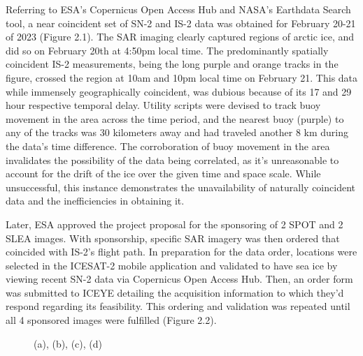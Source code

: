 Referring to ESA's Copernicus Open Access Hub and NASA's Earthdata Search tool, a near coincident set of SN-2 and IS-2 data was obtained for February 20-21 of 2023 (Figure 2.1). The SAR imaging clearly captured regions of arctic ice, and did so on February 20th at 4:50pm local time. The predominantly spatially coincident IS-2 measurements, being the long purple and orange tracks in the figure, crossed the region at 10am and 10pm local time on February 21. This data while immensely geographically coincident, was dubious because of its 17 and 29 hour respective temporal delay. Utility scripts were devised to track buoy movement in the area across the time period, and the nearest buoy (purple) to any of the tracks was 30 kilometers away and had traveled another 8 km during the data's time difference. The corroboration of buoy movement in the area invalidates the possibility of the data being correlated, as it's unreasonable to account for the drift of the ice over the given time and space scale. While unsuccessful, this instance demonstrates the unavailability of naturally coincident data and the inefficiencies in obtaining it.

Later, ESA approved the project proposal for the sponsoring of 2 SPOT and 2 SLEA images. With sponsorship, specific SAR imagery was then ordered that coincided with IS-2's flight path. In preparation for the data order, locations were selected in the ICESAT-2 mobile application and validated to have sea ice by viewing recent SN-2 data via Copernicus Open Access Hub. Then, an order form was submitted to ICEYE detailing the acquisition information to which they'd respond regarding its feasibility. This ordering and validation was repeated until all 4 sponsored images were fulfilled (Figure 2.2).

\begin{figure}[h!]
    \centering
    \caption{(a), (b), (c), (d)}
    \label{gathered-sar}

\end{figure}

